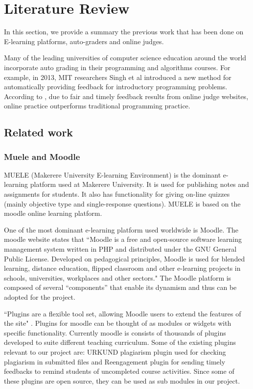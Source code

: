\documentclass[12pt]{article}
\begin{document}
\newpage

\section{Literature Review}
	In this section, we provide a summary the previous work that has been done on E-learning platforms, auto-graders and online judges.
	
	Many of the leading universities of computer science education around the world incorporate auto grading in their 			programming and algorithms courses. For example, in 2013, MIT researchers Singh et al \cite{singh} introduced a new method for automatically providing feedback for introductory programming problems. According to \cite{ojpot}, due to fair and timely feedback results from online judge websites, online practice outperforms traditional programming practice.

	\subsection{Related work}
		\subsubsection{Muele and Moodle}
		MUELE (Makerere University E-learning Environment) \cite{muele} is the dominant e-learning platform used at Makerere University. It is used for publishing notes and assignments for students. It also has functionality for giving on-line quizzes (mainly objective type and single-response questions). MUELE is based on the moodle online learning platform.
		
		One of the most dominant e-learning platform used worldwide is Moodle. The moodle website \cite{moodle} states that ``Moodle is a free and open-source software 	learning management system written in PHP and distributed under the GNU General Public License. Developed on pedagogical principles, Moodle is used for blended learning, distance education, flipped classroom and other e-learning projects in schools, universities, workplaces and other sectors." The Moodle platform is composed of several “components” that enable its dynamism and thus can be adopted for the project.
		
		``Plugins are a flexible tool set, allowing Moodle users to extend the features of the site" \cite{moodle}. Plugins for moodle can be thought of as modules or widgets with specific functionality. Currently moodle is consists of thousands of plugins developed to suite different teaching curriculum. Some of the existing plugins relevant to our project are: URKUND plagiarism plugin \cite{urkund} used for checking plagiarism in submitted files and Reengagement plugin \cite{reengagement} for sending timely feedbacks to remind students of uncompleted course activities. Since some of these plugins are open source, they can be used as sub modules in our project.
\end{document}
